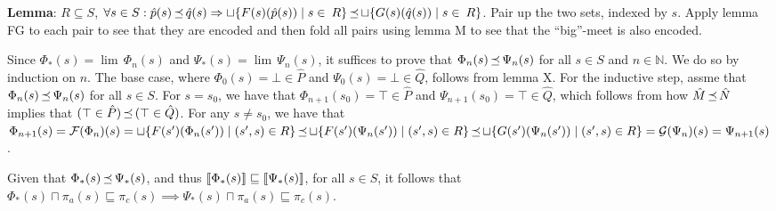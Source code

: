 
\textbf{Lemma}: $R \subseteq S$, $\forall s \in S : \hat p(s) \operatorname{\mathrel{\preceq}} \hat q(s) \Rightarrow \sqcup \{ F(s)(\hat p(s)) \mid s \in \: R \} \operatorname{\mathrel{\preceq}} \sqcup \{ G(s)(\hat q(s)) \mid s \in \: R \}$. Pair up the two sets, indexed by $s$. Apply lemma FG to each pair to see that they are encoded and then fold all pairs using lemma M to see that the ``big''-meet is also encoded.

Since $\Phi_{*}(s) = \lim \, \Phi_{n}(s)$ and $\Psi_{*}(s) = \lim \, \Psi_{n}(s)$, it suffices to prove that $\Phi_{n}(s) \operatorname{\mathrel{\preceq}} \Psi_{n}(s)$ for all $s \in S$ and $n \in \mathbb{N}$. We do so by induction on $n$. The base case, where $\Phi_{0}(s) = \bot \in \hat P$ and $\Psi_{0}(s) = \bot \in \hat Q$, follows from lemma X. For the inductive step, assme that $\Phi_{n}(s) \operatorname{\mathrel{\preceq}} \Psi_{n}(s)$ for all $s \in S$. For $s = s_{0}$, we have that $\Phi_{n+1}(s_{0}) = \top \in \hat P$ and $\Psi_{n+1}(s_{0}) = \top \in \hat Q$, which follows from how $\hat M \operatorname{\mathrel{\preceq}} \hat N$ implies that $(\top \in \hat P) \operatorname{\mathrel{\preceq}} \, (\top \in \hat Q)$. For any $s \neq s_{0}$, we have that $\Phi_{n+1}(s) = \mathcal{F}(\Phi_{n})(s) = \sqcup \{ F(s')(\Phi_{n}(s')) \mid (s',s) \in R \} \operatorname{\mathrel{\preceq}} \sqcup \{ F(s')(\Psi_{n}(s')) \mid (s',s) \in R \} \operatorname{\mathrel{\preceq}} \sqcup \{ G(s')(\Psi_{n}(s')) \mid (s',s) \in R \} = \mathcal{G}(\Psi_{n})(s) = \Psi_{n+1}(s)$.

Given that $\Phi_{*}(s) \operatorname{\mathrel{\preceq}} \Psi_{*}(s)$, and thus $\llbracket\Phi_{*}(s)\rrbracket \sqsubseteq \llbracket\Psi_{*}(s)\rrbracket$, for all $s \in S$, it follows that $\Phi_{*}(s) \sqcap \pi_{a}(s) \sqsubseteq \pi_{c}(s) \implies \Psi_{*}(s) \sqcap \pi_{a}(s) \sqsubseteq \pi_{c}(s)$.

